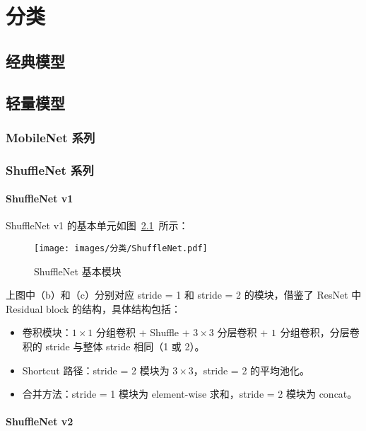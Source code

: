 \part{分类}

\chapter{经典模型}

\chapter{轻量模型}

\section{MobileNet 系列}

\section{ShuffleNet 系列}
\subsection{ShuffleNet v1}
ShuffleNet v1 的基本单元如图~\ref{fig:shufflenet}~所示：

\begin{figure}[ht]
  \centering
  \texttt{[image: images/分类/ShuffleNet.pdf]}
  \caption{ShuffleNet 基本模块}
  \label{fig:shufflenet}
\end{figure}

上图中（b）和（c）分别对应 stride = 1 和 stride = 2 的模块，借鉴了 ResNet 中
Residual block 的结构，具体结构包括：

\begin{itemize}
  \item 卷积模块：$1 \times 1$ 分组卷积 + Shuffle + $3 \times 3$ 分层卷积 + $1
    \time 1$ 分组卷积，分层卷积的 stride 与整体 stride 相同（1 或 2）。
  \item Shortcut 路径：stride = 2 模块为 $3 \times 3$，stride = 2 的平均池化。
  \item 合并方法：stride = 1 模块为 element-wise 求和，stride = 2 模块为 concat。
\end{itemize}

\subsection{ShuffleNet v2}


